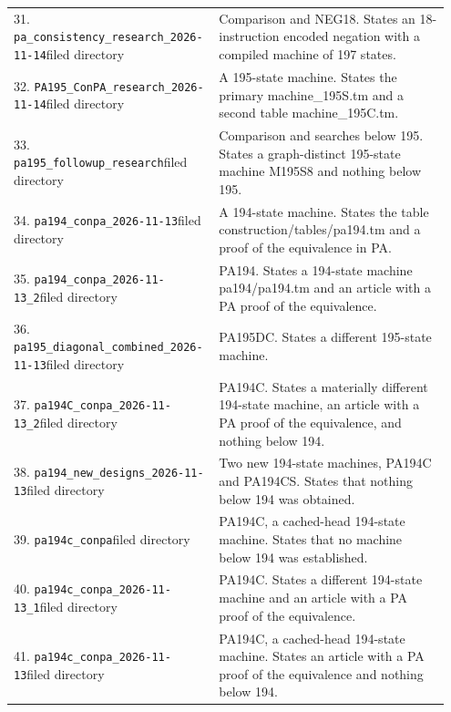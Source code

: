 \begin{longtable}{@{}p{0.43\linewidth}p{0.52\linewidth}@{}}
31. \nolinkurl{pa_consistency_research_2026-11-14}\newline filed directory&Comparison and NEG18. States an 18-instruction encoded negation with a compiled machine of 197 states.\\[5pt]
32. \nolinkurl{PA195_ConPA_research_2026-11-14}\newline filed directory&A 195-state machine. States the primary machine\_195S.tm and a second table machine\_195C.tm.\\[5pt]
33. \nolinkurl{pa195_followup_research}\newline filed directory&Comparison and searches below 195. States a graph-distinct 195-state machine M195S8 and nothing below 195.\\[5pt]
34. \nolinkurl{pa194_conpa_2026-11-13}\newline filed directory&A 194-state machine. States the table construction/tables/pa194.tm and a proof of the equivalence in PA.\\[5pt]
35. \nolinkurl{pa194_conpa_2026-11-13_2}\newline filed directory&PA194. States a 194-state machine pa194/pa194.tm and an article with a PA proof of the equivalence.\\[5pt]
36. \nolinkurl{pa195_diagonal_combined_2026-11-13}\newline filed directory&PA195DC. States a different 195-state machine.\\[5pt]
37. \nolinkurl{pa194C_conpa_2026-11-13_2}\newline filed directory&PA194C. States a materially different 194-state machine, an article with a PA proof of the equivalence, and nothing below 194.\\[5pt]
38. \nolinkurl{pa194_new_designs_2026-11-13}\newline filed directory&Two new 194-state machines, PA194C and PA194CS. States that nothing below 194 was obtained.\\[5pt]
39. \nolinkurl{pa194c_conpa}\newline filed directory&PA194C, a cached-head 194-state machine. States that no machine below 194 was established.\\[5pt]
40. \nolinkurl{pa194c_conpa_2026-11-13_1}\newline filed directory&PA194C. States a different 194-state machine and an article with a PA proof of the equivalence.\\[5pt]
41. \nolinkurl{pa194c_conpa_2026-11-13}\newline filed directory&PA194C, a cached-head 194-state machine. States an article with a PA proof of the equivalence and nothing below 194.\\[5pt]

\end{longtable}
